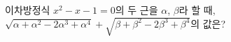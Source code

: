 이차방정식 $x^2-x-1=0$의 두 근을 $\alpha$, $\beta$라 할 때, $\sqrt{\alpha+\alpha^2-2\alpha^3+\alpha^4}+\sqrt{\beta+\beta^2-2\beta^3+\beta^4}$의 값은?
